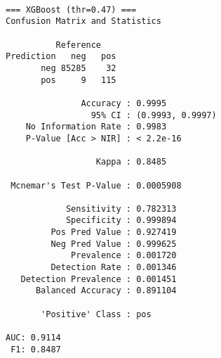 \documentclass[
  11pt,
  letterpaper,
  DIV=11,
  numbers=noendperiod]{scrartcl}
\newenvironment{Shaded}{}{}
\newcommand{\AttributeTok}[1]{\textcolor[rgb]{0.84,0.23,0.29}{#1}}
\newcommand{\DocumentationTok}[1]{\textcolor[rgb]{0.42,0.45,0.49}{#1}}
\newcommand{\FunctionTok}[1]{\textcolor[rgb]{0.44,0.26,0.76}{#1}}
\newcommand{\NormalTok}[1]{\textcolor[rgb]{0.14,0.16,0.18}{#1}}
\newcommand{\OtherTok}[1]{\textcolor[rgb]{0.44,0.26,0.76}{#1}}
\newcommand{\SpecialCharTok}[1]{\textcolor[rgb]{0.00,0.36,0.77}{#1}}
\newcommand{\StringTok}[1]{\textcolor[rgb]{0.01,0.18,0.38}{#1}}
\begin{document}
\begin{verbatim}

=== XGBoost (thr=0.47) ===
Confusion Matrix and Statistics

          Reference
Prediction   neg   pos
       neg 85285    32
       pos     9   115
                                          
               Accuracy : 0.9995          
                 95% CI : (0.9993, 0.9997)
    No Information Rate : 0.9983          
    P-Value [Acc > NIR] : < 2.2e-16       
                                          
                  Kappa : 0.8485          
                                          
 Mcnemar's Test P-Value : 0.0005908       
                                          
            Sensitivity : 0.782313        
            Specificity : 0.999894        
         Pos Pred Value : 0.927419        
         Neg Pred Value : 0.999625        
             Prevalence : 0.001720        
         Detection Rate : 0.001346        
   Detection Prevalence : 0.001451        
      Balanced Accuracy : 0.891104        
                                          
       'Positive' Class : pos             
                                          
AUC: 0.9114 
 F1: 0.8487 
\end{verbatim}

\begin{Shaded}
\end{Shaded}
\end{document}
